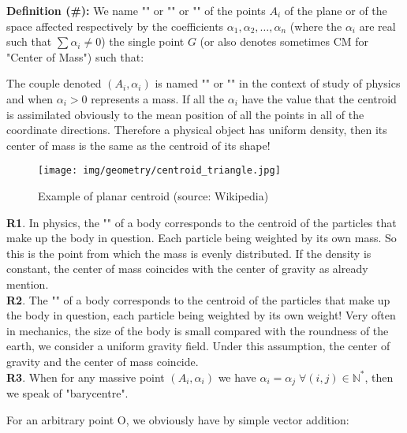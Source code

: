    \textbf{Definition (\#\mydef):} We name "" or "" or "" of the points $A_i$ of the plane or of the space affected respectively by the coefficients $\alpha_1,\alpha_2,\ldots,\alpha_n$ (where the $\alpha_i$ are real such that $\sum \alpha_i\neq 0$) the single point $G$ (or also denotes sometimes CM for "Center of Mass") such that:
	
	The couple denoted $(A_i,\alpha_i)$ is named "" or "" in the context of study of physics and when $\alpha_i>0$ represents a mass. If all the $\alpha_i$ have the value that the centroid is assimilated obviously to the  mean position of all the points in all of the coordinate directions.  Therefore a physical object has uniform density, then its center of mass is the same as the centroid of its shape!
	\begin{figure}[H]
		\centering
		\texttt{[image: img/geometry/centroid\_triangle.jpg]}
		\caption[Example of planar centroid]{Example of planar centroid (source: Wikipedia)}
	\end{figure}
	
	\begin{tcolorbox}[title=Remarks,colframe=black,arc=10pt]
	\textbf{R1}. In physics, the "" of a body corresponds to the centroid of the particles that make up the body in question. Each particle being weighted by its own mass. So this is the point from which the mass is evenly distributed. If the density is constant, the center of mass coincides with the center of gravity as already mention.\\

	\textbf{R2}. The "" of a body corresponds to the centroid of the particles that make up the body in question, each particle being weighted by its own weight! Very often in mechanics, the size of the body is small compared with the roundness of the earth, we consider a uniform gravity field. Under this assumption, the center of gravity and the center of mass coincide.\\

	\textbf{R3}. When for any massive point $(A_i,\alpha_i)$ we have $\alpha_i=\alpha_j\;\forall (i,j)\in \mathbb{N}^{*}$, then we speak of "barycentre".
	\end{tcolorbox}
	For an arbitrary point O, we obviously have by simple vector addition:
	
